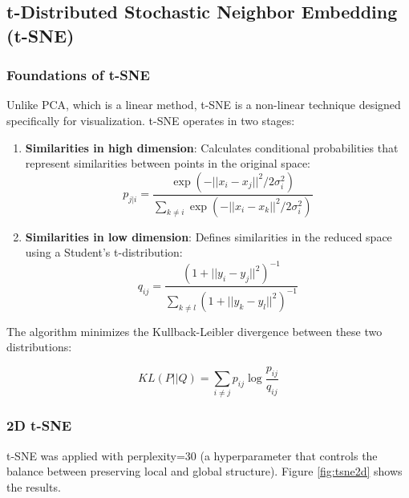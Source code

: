 \documentclass[12pt,a4paper]{article}
\begin{document}
\subsection{t-Distributed Stochastic Neighbor Embedding (t-SNE)}

\subsubsection{Foundations of t-SNE}

Unlike PCA, which is a linear method, t-SNE is a non-linear technique designed specifically for visualization. t-SNE operates in two stages:

\begin{enumerate}
    \item \textbf{Similarities in high dimension}: Calculates conditional probabilities that represent similarities between points in the original space:
    \begin{equation}
    p_{j|i} = \frac{\exp(-||x_i - x_j||^2 / 2\sigma_i^2)}{\sum_{k \neq i} \exp(-||x_i - x_k||^2 / 2\sigma_i^2)}
    \end{equation}
    
    \item \textbf{Similarities in low dimension}: Defines similarities in the reduced space using a Student's t-distribution:
    \begin{equation}
    q_{ij} = \frac{(1 + ||y_i - y_j||^2)^{-1}}{\sum_{k \neq l} (1 + ||y_k - y_l||^2)^{-1}}
    \end{equation}
\end{enumerate}

The algorithm minimizes the Kullback-Leibler divergence between these two distributions:

\begin{equation}
KL(P||Q) = \sum_{i \neq j} p_{ij} \log \frac{p_{ij}}{q_{ij}}
\end{equation}

\subsubsection{2D t-SNE}

t-SNE was applied with perplexity=30 (a hyperparameter that controls the balance between preserving local and global structure). Figure \ref{fig:tsne2d} shows the results.
\end{document}
